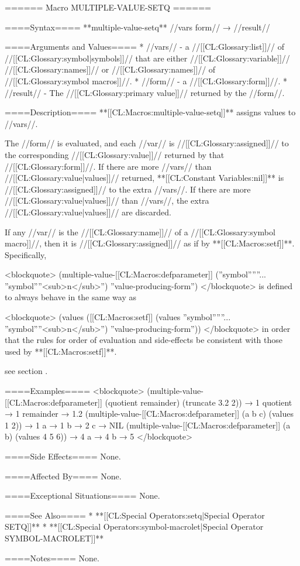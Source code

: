 ====== Macro MULTIPLE-VALUE-SETQ ======

====Syntax====
**multiple-value-setq** //vars form// → //result//

====Arguments and Values====
  * //vars// - a //[[CL:Glossary:list]]// of //[[CL:Glossary:symbol|symbols]]// that are either //[[CL:Glossary:variable]]// //[[CL:Glossary:names]]// or //[[CL:Glossary:names]]// of //[[CL:Glossary:symbol macros]]//.
  * //form// - a //[[CL:Glossary:form]]//.
  * //result// - The //[[CL:Glossary:primary value]]// returned by the //form//.

====Description====
**[[CL:Macros:multiple-value-setq]]** assigns values to //vars//.

The //form// is evaluated, and each //var// is //[[CL:Glossary:assigned]]// to the corresponding //[[CL:Glossary:value]]// returned by that //[[CL:Glossary:form]]//. If there are more //vars// than //[[CL:Glossary:value|values]]// returned, **[[CL:Constant Variables:nil]]** is //[[CL:Glossary:assigned]]// to the extra //vars//. If there are more //[[CL:Glossary:value|values]]// than //vars//, the extra //[[CL:Glossary:value|values]]// are discarded.

If any //var// is the //[[CL:Glossary:name]]// of a //[[CL:Glossary:symbol macro]]//, then it is //[[CL:Glossary:assigned]]// as if by **[[CL:Macros:setf]]**. Specifically,

\begingroup {} \def\subN{''<sub>n</sub>''} <blockquote> (multiple-value-[[CL:Macros:defparameter]] (''symbol''\subOne ... ''symbol''\subN) ''value-producing-form'') </blockquote> is defined to always behave in the same way as

<blockquote> (values ([[CL:Macros:setf]] (values ''symbol''\subOne ... ''symbol''\subN) ''value-producing-form'')) </blockquote> \endgroup in order that the rules for order of evaluation and side-effects be consistent with those used by **[[CL:Macros:setf]]**.

see section {\secref\SETFofVALUES}.

====Examples====
<blockquote> (multiple-value-[[CL:Macros:defparameter]] (quotient remainder) (truncate 3.2 2)) → 1 quotient → 1 remainder → 1.2 (multiple-value-[[CL:Macros:defparameter]] (a b c) (values 1 2)) → 1 a → 1 b → 2 c → NIL (multiple-value-[[CL:Macros:defparameter]] (a b) (values 4 5 6)) → 4 a → 4 b → 5 </blockquote>

====Side Effects====
None.

====Affected By====
None.

====Exceptional Situations====
None.

====See Also====
  * **[[CL:Special Operators:setq|Special Operator SETQ]]**
  * **[[CL:Special Operators:symbol-macrolet|Special Operator SYMBOL-MACROLET]]**

====Notes====
None.

 
